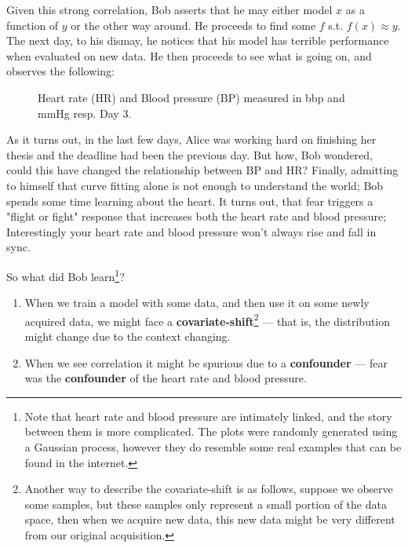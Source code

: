 Given this strong correlation, Bob asserts that he may either model $x$ as a function of $y$ or the other way 
around. He proceeds to find some $f$ s.t. $f(x) \approx y$. The next day, to his dismay, he notices that his
model has terrible performance when evaluated on new data. He then proceeds to see what is going on, and 
observes the following:

\begin{figure}[htb]
    \centering
    \caption{Heart rate (HR) and Blood pressure (BP) measured in bbp and mmHg resp. Day 3.}
\end{figure}

As it turns out, in the last few days, Alice was working hard on finishing her thesis and the deadline had been 
the previous day. But how, Bob wondered, could this have changed the relationship between BP and HR? 
Finally, admitting to himself that curve fitting alone is not enough to understand the world; 
Bob spends some time learning about the heart. It turns out, that fear triggers a "flight or fight"
response that increases both the heart rate and blood pressure; Interestingly your heart rate and blood pressure 
won’t always rise and fall in sync.

So what did Bob learn\footnote{
    Note that heart rate and blood pressure are intimately linked, and the story between them is more complicated.
    The plots were randomly generated using a Gaussian process, however they do resemble some real examples that 
    can be found in the internet.
}?

\begin{enumerate}
    \item When we train a model with some data, and then use it on some newly acquired data, we might
    face a \textbf{covariate-shift}\footnote{Another way to describe the covariate-shift is as follows, 
    suppose we observe some samples, but
    these samples only represent a small portion of the data space, then when we acquire new data, this new data might be very 
    different from our original acquisition. } --- that is, the distribution might change due to the context changing.
    \item When we see correlation it might be spurious due to a \textbf{confounder} --- fear was the \textbf{confounder} 
    of the heart rate and blood pressure.
\end{enumerate}

